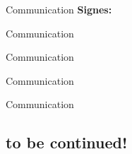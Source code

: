 \begin{frame}{Communication}  
	\textbf{Signes:}
	\vfill
\end{frame}

\begin{frame}{Communication}
	\\
\end{frame}

\begin{frame}{Communication}
	\\
\end{frame}

\begin{frame}{Communication}
\end{frame}

\begin{frame}{Communication}
	\\
\end{frame}

\subsection{to be continued!}

\begin{frame}{}
	\begin{center}
		\resizebox{!}{18pt}{\strut\textbf{\insertsubsection}\strut}	
	\end{center}
\end{frame}











